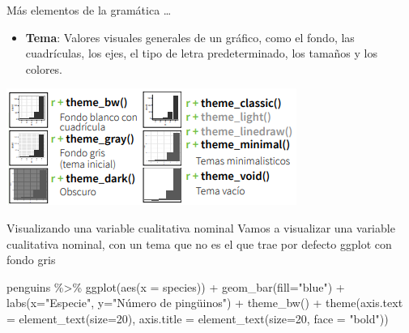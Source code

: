 \documentclass[
  ignorenonframetext,
  aspectratio=169]{beamer}
\newenvironment{Shaded}{\begin{snugshade}}{\end{snugshade}}
\newcommand{\AttributeTok}[1]{\textcolor[rgb]{0.77,0.63,0.00}{#1}}
\newcommand{\DecValTok}[1]{\textcolor[rgb]{0.00,0.00,0.81}{#1}}
\newcommand{\FunctionTok}[1]{\textcolor[rgb]{0.00,0.00,0.00}{#1}}
\newcommand{\NormalTok}[1]{#1}
\newcommand{\SpecialCharTok}[1]{\textcolor[rgb]{0.00,0.00,0.00}{#1}}
\newcommand{\StringTok}[1]{\textcolor[rgb]{0.31,0.60,0.02}{#1}}
\providecommand{\tightlist}{%
  \setlength{\itemsep}{0pt}\setlength{\parskip}{0pt}}
\begin{document}
\begin{frame}{Más elementos de la gramática \ldots{}}
\protect\hypertarget{muxe1s-elementos-de-la-gramuxe1tica-5}{}
\begin{itemize}
\tightlist
\item
  \textbf{Tema}: Valores visuales generales de un gráfico, como el
  fondo, las cuadrículas, los ejes, el tipo de letra predeterminado, los
  tamaños y los colores.
\end{itemize}

\begin{center}\includegraphics[width=0.4\linewidth,height=0.4\textheight]{Imgs/temas} \end{center}
\end{frame}

\begin{frame}[fragile]{Visualizando una variable cualitativa nominal}
\protect\hypertarget{visualizando-una-variable-cualitativa-nominal}{}
Vamos a visualizar una variable cualitativa nominal, con un tema que no
es el que trae por defecto ggplot con fondo gris

\begin{Shaded}
\begin{Highlighting}[]
\NormalTok{penguins }\SpecialCharTok{\%\textgreater{}\%} 
  \FunctionTok{ggplot}\NormalTok{(}\FunctionTok{aes}\NormalTok{(}\AttributeTok{x =}\NormalTok{ species)) }\SpecialCharTok{+}
  \FunctionTok{geom\_bar}\NormalTok{(}\AttributeTok{fill=}\StringTok{"blue"}\NormalTok{) }\SpecialCharTok{+} 
  \FunctionTok{labs}\NormalTok{(}\AttributeTok{x=}\StringTok{"Especie"}\NormalTok{, }\AttributeTok{y=}\StringTok{"Número de pingüinos"}\NormalTok{) }\SpecialCharTok{+}
  \FunctionTok{theme\_bw}\NormalTok{() }\SpecialCharTok{+}
  \FunctionTok{theme}\NormalTok{(}\AttributeTok{axis.text =} \FunctionTok{element\_text}\NormalTok{(}\AttributeTok{size=}\DecValTok{20}\NormalTok{),}
        \AttributeTok{axis.title =} \FunctionTok{element\_text}\NormalTok{(}\AttributeTok{size=}\DecValTok{20}\NormalTok{, }\AttributeTok{face =} \StringTok{"bold"}\NormalTok{)) }
\end{Highlighting}
\end{Shaded}
\end{frame}
\end{document}
